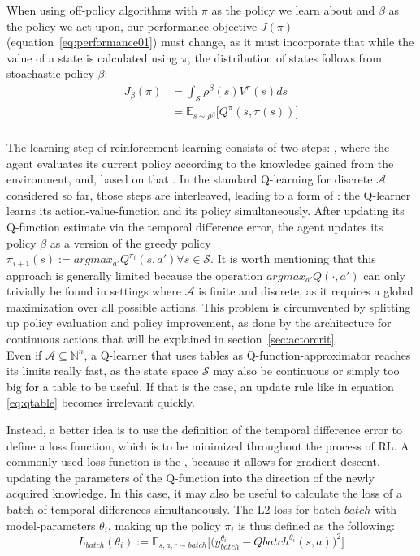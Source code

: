 When using off-policy algorithms with $\pi$ as the policy we learn about and $\beta$ as the policy we act upon, our performance objective $J(\pi)$ (equation~\ref{eq:performance01}) must change, as it must incorporate that while the value of a state is calculated using $\pi$, the distribution of states follows from stoachastic policy $\beta$: 
\begin{align} 
	J_\beta(\pi) &= \int_{\mathcal{S}} \rho^\beta(s) V^\pi(s) ds \nonumber\\
	&= \mathds{E}_{s\sim\rho^\beta} \big[Q^\pi(s, \pi(s)) \big] \label{eq:performance}
\end{align}\\

The learning step of reinforcement learning consists of two steps: , where the agent evaluates its current policy according to the knowledge gained from the environment, and, based on that . In the standard Q-learning for discrete $\mathcal{A}$ considered so far, those steps are interleaved, leading to a form of : the Q-learner learns its action-value-function and its policy simultaneously. After updating its Q-function estimate via the temporal difference error, the agent updates its policy $\beta$ as a  version of the greedy policy $\pi_{i+1}(s) := argmax_{a'} Q^{\pi_i}(s,a') \forall s \in \mathcal{S}$. It is worth mentioning that this approach is generally limited because the  operation $argmax_{a'}Q(\cdot, a')$ can only trivially be found in settings where $\mathcal{A}$ is finite and discrete, as it requires a global maximization over all possible actions. This problem is circumvented by splitting up policy evaluation and policy improvement, as done by the architecture for continuous actions that will be explained in section~\ref{sec:actorcrit}.\\

Even if $\mathcal{A} \subseteq \mathds{N}^n$, a Q-learner that uses tables as Q-function-approximator reaches its limits really fast, as the state space $\mathcal{S}$ may also be continuous or simply too big for a table to be useful. If that is the case, an update rule like in equation \ref{eq:qtable} becomes irrelevant quickly. 

Instead, a better idea is to use the definition of the temporal difference error to define a loss function, which is to be minimized throughout the process of RL. A commonly used loss function is the , because it allows for gradient descent, updating the parameters of the Q-function into the direction of the newly acquired knowledge. In this case, it may also be useful to calculate the loss of a batch of temporal differences simultaneously. The L2-loss for batch $batch$ with model-parameters $\theta_i$, making up the policy $\pi_i$ is thus defined as the following: 
\begin{equation} \label{l2loss}
	L_{batch}(\theta_i) := \mathds{E}_{s,a,r \sim batch} \Big[ \big( y_{batch}^{\theta_i} - Q{batch}^{\theta_i}(s, a)\big)^2 \Big]
\end{equation}







